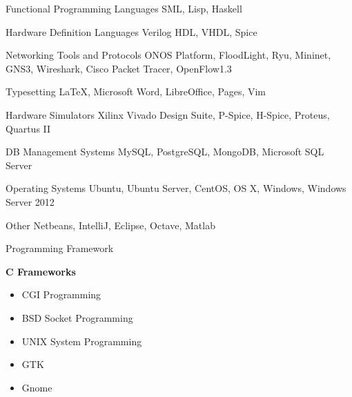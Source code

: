 \documentclass[]{friggeri-cv} %
\begin{document}
\begin{entrylist}

	\entry{\textcolor{TextGreen}{$\bullet$}}
	{Functional Programming Languages}
	{}
	{SML, Lisp, Haskell}


	\entry{\textcolor{TextOrange}{$\bullet$}}
	{Hardware Definition Languages}
	{}
	{Verilog HDL, VHDL, Spice}


	\entry{\textcolor{DarkBlue}{$\bullet$}}
	{Networking Tools and Protocols}
	{}
	{ONOS Platform, FloodLight, Ryu, Mininet, GNS3, Wireshark, Cisco Packet Tracer, OpenFlow1.3}


	\entry{\textcolor{Ocean}{$\bullet$}}
	{Typesetting}
	{}
	{\LaTeX, Microsoft Word, LibreOffice, Pages, Vim}


	\entry{\textcolor{LightGray}{$\bullet$}}
	{Hardware Simulators}
	{}
	{Xilinx Vivado Design Suite, P-Spice, H-Spice, Proteus, Quartus II}


	\entry{\textcolor{TextYellow}{$\bullet$}}
	{DB Management Systems}
	{}
	{MySQL, PostgreSQL, MongoDB, Microsoft SQL Server}


	\entry{\textcolor{TextRed}{$\bullet$}}
	{Operating Systems}
	{}
	{Ubuntu, Ubuntu Server, CentOS, OS X, Windows, Windows Server 2012}


	\entry{\textcolor{TextPink}{$\bullet$}}
	{Other}
	{}
	{Netbeans, IntelliJ, Eclipse, Octave, Matlab}


	\entry{\textcolor{UniBlue}{$\bullet$}}
	{Programming Framework}
	{}
	{
		\textbf{C Frameworks}
		\begin{itemize}
			\item CGI Programming
			\item BSD Socket Programming
			\item UNIX System Programming
			\item GTK
			\item Gnome
		\end{itemize}
	
}
\end{entrylist}
\end{document}
